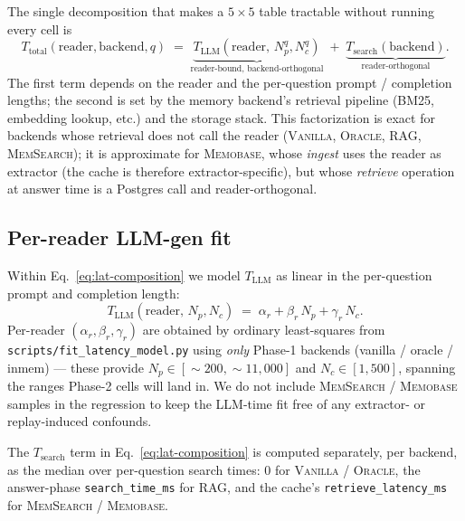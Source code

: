 The single decomposition that makes a $5\!\times\!5$ table tractable
without running every cell is
\begin{equation}
T_{\text{total}}(\text{reader}, \text{backend}, q) \;=\;
\underbrace{T_{\text{LLM}}(\text{reader},\, N_p^q, N_c^q)}_{\text{reader-bound, backend-orthogonal}}
\;+\;
\underbrace{T_{\text{search}}(\text{backend})}_{\text{reader-orthogonal}}.
\label{eq:lat-composition}
\end{equation}
The first term depends on the reader and the per-question prompt /
completion lengths; the second is set by the memory backend's retrieval
pipeline (BM25, embedding lookup, etc.) and the storage stack. This
factorization is exact for backends whose retrieval does not call the
reader (\textsc{Vanilla}, \textsc{Oracle}, \textsc{RAG},
\textsc{MemSearch}); it is approximate for \textsc{Memobase}, whose
\emph{ingest} uses the reader as extractor (the cache is therefore
extractor-specific), but whose \emph{retrieve} operation at answer time
is a Postgres call and reader-orthogonal.

\subsection{Per-reader LLM-gen fit}
\label{app:lat:fit}

Within Eq.~\ref{eq:lat-composition} we model
$T_{\text{LLM}}$ as linear in the per-question prompt and completion
length:
\begin{equation}
T_{\text{LLM}}(\text{reader},\, N_p, N_c) \;=\;
\alpha_r + \beta_r\, N_p + \gamma_r\, N_c.
\label{eq:lat-fit}
\end{equation}
Per-reader $(\alpha_r,\beta_r,\gamma_r)$ are obtained by ordinary
least-squares from \texttt{scripts/fit\_latency\_model.py} using
\emph{only} Phase-1 backends (vanilla / oracle / inmem) — these provide
$N_p \in [\sim\!200,\sim\!11{,}000]$ and $N_c \in [1, 500]$, spanning the
ranges Phase-2 cells will land in. We do not include
\textsc{MemSearch} / \textsc{Memobase} samples in the regression to keep
the LLM-time fit free of any extractor- or replay-induced confounds.

The $T_{\text{search}}$ term in Eq.~\ref{eq:lat-composition} is computed
separately, per backend, as the median over per-question search times:
$0$ for \textsc{Vanilla} / \textsc{Oracle}, the answer-phase
\texttt{search\_time\_ms} for \textsc{RAG}, and the cache's
\texttt{retrieve\_latency\_ms} for \textsc{MemSearch} / \textsc{Memobase}.



